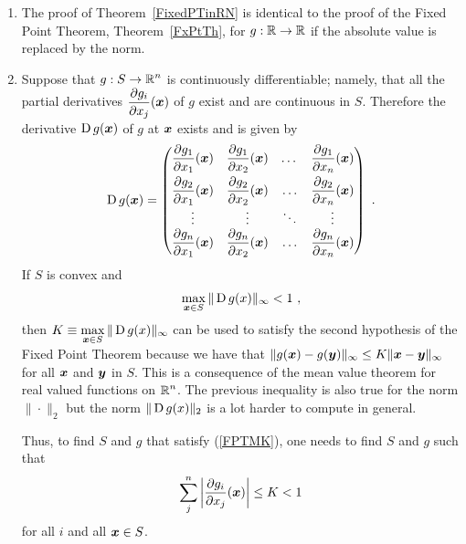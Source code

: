 \begin{rmkList}
\begin{enumerate}
\item The proof of Theorem~\ref{FixedPTinRN} is identical to the proof of
the Fixed Point Theorem, Theorem~\ref{FxPtTh}, for
$g:\mathbb{R} \rightarrow \mathbb{R}$ if the absolute value is replaced by the
norm.
\item Suppose that $\displaystyle g:S\to \mathbb{R}^n$ is continuously differentiable;
namely, that all the partial derivatives
$\displaystyle \frac{\partial{g_i}}{\partial{x_j}}(\bm{x})$ of $g$
exist and are continuous in $S$.  Therefore the derivative
$\operatorname{D} g(\bm{x})$ of $g$ at $\bm{x}$ exists and is given by
\[
\operatorname{D} g(\bm{x}) = \begin{pmatrix}
\displaystyle \frac{\partial{g_1}}{\partial{x_1}}(\bm{x}) &
\displaystyle \frac{\partial{g_1}}{\partial{x_2}}(\bm{x}) & \dots &
\displaystyle \frac{\partial{g_1}}{\partial{x_n}}(\bm{x}) \\[0.8em]
\displaystyle \frac{\partial{g_2}}{\partial{x_1}}(\bm{x}) &
\displaystyle \frac{\partial{g_2}}{\partial{x_2}}(\bm{x}) & \ldots &
\displaystyle \frac{\partial{g_2}}{\partial{x_n}}(\bm{x}) \\
\vdots & \vdots & \ddots & \vdots \\
\displaystyle \frac{\partial{g_n}}{\partial{x_1}}(\bm{x}) &
\displaystyle \frac{\partial{g_n}}{\partial{x_2}}(\bm{x}) & \ldots &
\displaystyle \frac{\partial{g_n}}{\partial{x_n}}(\bm{x})
\end{pmatrix} \ .
\]
If $S$ is convex and
\begin{equation}\label{FPTMK}
\max_{\bm{x} \in S} \|\operatorname{D} g(x)\|_\infty < 1 \ ,
\end{equation}
then $\displaystyle K \equiv \max_{\bm{x} \in S} \|\operatorname{D} g(x)\|_\infty$ can
be used to satisfy the second hypothesis of the Fixed Point Theorem
because we have that
$\| g(\bm{x}) - g(\bm{y}) \|_\infty \leq K \| \bm{x} - \bm{y} \|_\infty$
for all $\bm{x}$ and $\bm{y}$ in $S$.
This is a consequence of the mean value theorem for real valued
functions on $\displaystyle \mathbb{R}^n$.  The previous inequality is also
true for the norm $\|\cdot\|_2$ but the norm $\|\operatorname{D} g(x)\|_2$ is a
lot harder to compute in general.

Thus, to find $S$ and $g$ that satisfy (\ref{FPTMK}), one needs to
find $S$ and $g$ such that
\[
\sum_j^n \bigg|\frac{\partial{g_i}}{\partial{x_j}}(\bm{x})\bigg| \leq K < 1
\]
for all $i$ and all $\bm{x} \in S$.
\end{enumerate}
\label{rmkKcondFP}
\end{rmkList}

